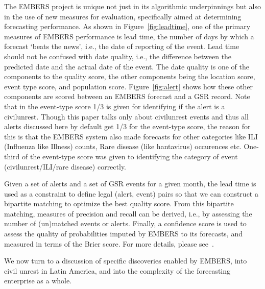 The EMBERS project is unique not just in its algorithmic underpinnings but also in the use of new measures
for evaluation, specifically aimed at determining forecasting performance. As
shown in Figure~\ref{fig:leadtime},
one of the primary measures of EMBERS performance is lead time, the number of days by which a forecast
`beats the news', i.e., the date of reporting of the event. Lead time should not be confused with
date quality, i.e., the difference between the predicted date and the actual date of the event. The date
quality is one of the components to the quality score, the other components being the
location score, event type score, and population score.
Figure~\ref{fig:alert} 
shows how these other
components are scored between an EMBERS forecast and a GSR record.
{\color{red} Note
that in the event-type score 1/3 is given for identifying if the alert
is a civilunrest. Though this paper talks only about civilunrest events and
thus all alerts discussed here by default get 1/3 for the event-type score, the reason
for this is that the EMBERS system also made forecasts for other categories like ILI
(Influenza like Illness) counts, Rare disease (like hantavirus)
occurences etc. One-third of the event-type score was given to
identifying the category of event (civilunrest/ILI/rare disease)
correctly.}

Given a set of alerts and a set of
GSR events for a given month, the lead time is used as a constraint to define legal (alert, event) pairs so that
we can construct a bipartite matching to optimize the best quality
score. From this bipartite matching,
measures of precision and recall can be derived, i.e., by assessing the number of (un)matched events or
alerts. Finally, a confidence score is used to assess the quality of probabilities imputed by EMBERS to its
forecasts, and measured in terms of the Brier score. For more details, please
see~\cite{kdd:beating-the-news}.

We now turn to a discussion of specific discoveries enabled by EMBERS, into civil unrest in Latin America, and into
the complexity of the forecasting enterprise as a whole.

